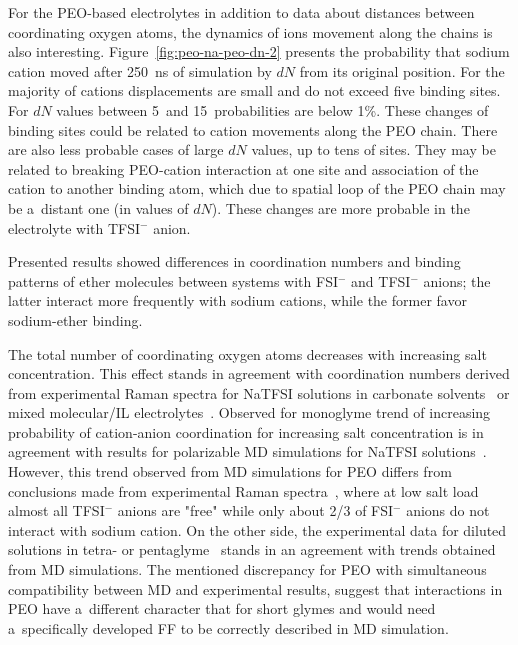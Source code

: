 For the PEO-based electrolytes in addition to data about distances between coordinating oxygen atoms, the dynamics of ions movement along the chains is also interesting. Figure~\ref{fig:peo-na-peo-dn-2} presents the probability that sodium cation moved after 250~ns of simulation by $dN$ from its original position. For the majority of cations displacements are small and do not exceed five binding sites. For $dN$ values between 5~and 15~probabilities are below 1\%. These changes of binding sites could be related to cation movements along the PEO chain. There are also less probable cases of large $dN$ values, up to tens of sites. They may be related to breaking PEO-cation interaction at one site and association of the cation to another binding atom, which due to spatial loop of the PEO chain may be a~distant one (in values of $dN$). These changes are more probable in the electrolyte with TFSI$^{-}$ anion.

Presented results showed differences in coordination numbers and binding patterns of ether molecules between systems with FSI$^{-}$ and TFSI$^{-}$ anions; the latter interact more frequently with sodium cations, while the former favor sodium-ether binding.

The total number of coordinating oxygen atoms decreases with increasing salt concentration. This effect stands in agreement with coordination numbers derived from experimental Raman spectra for NaTFSI solutions in carbonate solvents~\cite{peo-na-experimental-raman-1} or mixed molecular/IL electrolytes~\cite{peo-na-experimental-raman-2}. Observed for monoglyme trend of increasing probability of cation-anion coordination for increasing salt concentration is in agreement with results for polarizable MD simulations for NaTFSI solutions~\cite{peo-na-glyme-3}. However, this trend observed from MD simulations for PEO differs from conclusions made from experimental Raman spectra~\cite{ir-interactions-9}, where at low salt load almost all TFSI$^{-}$ anions are "free" while only about 2/3 of FSI$^{-}$ anions do not interact with sodium cation. On the other side, the experimental data for diluted solutions in tetra- or pentaglyme~\cite{na-dft-12} stands in an agreement with trends obtained from MD simulations. The mentioned discrepancy for PEO with simultaneous compatibility between MD and experimental results, suggest that interactions in PEO have a~different character that for short glymes and would need a~specifically developed FF to be correctly described in MD simulation.

\cleardoublepage